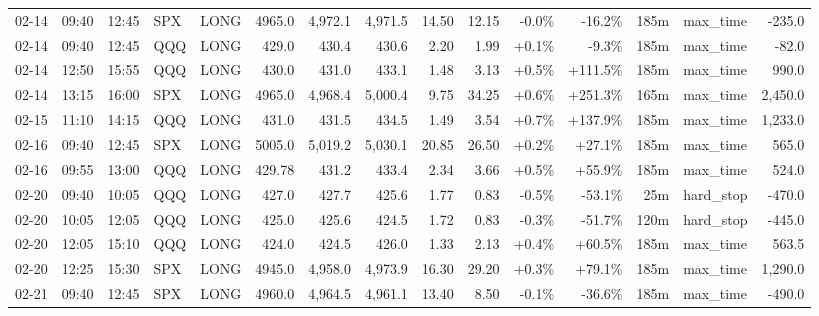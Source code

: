 \documentclass[11pt,a4paper,twoside]{article}
\begin{document}
\begin{landscape}
\begin{center}
\begin{longtable}{>{\color{txtmain}}l l l l l r r r r r r r r >{\color{txtmain}}l r}
02-14 & 09:40 & 12:45 & SPX & LONG & 4965.0 & 4,972.1 & 4,971.5 & 14.50 & 12.15 & \textcolor{lossred}{-0.0\%} & \textcolor{lossred}{-16.2\%} & 185m & max\_time & \textcolor{lossred}{-235.0} \\
02-14 & 09:40 & 12:45 & QQQ & LONG & 429.0 & 430.4 & 430.6 & 2.20 & 1.99 & \textcolor{wingreen}{+0.1\%} & \textcolor{lossred}{-9.3\%} & 185m & max\_time & \textcolor{lossred}{-82.0} \\
02-14 & 12:50 & 15:55 & QQQ & LONG & 430.0 & 431.0 & 433.1 & 1.48 & 3.13 & \textcolor{wingreen}{+0.5\%} & \textcolor{wingreen}{+111.5\%} & 185m & max\_time & \textcolor{wingreen}{990.0} \\
02-14 & 13:15 & 16:00 & SPX & LONG & 4965.0 & 4,968.4 & 5,000.4 & 9.75 & 34.25 & \textcolor{wingreen}{+0.6\%} & \textcolor{wingreen}{+251.3\%} & 165m & max\_time & \textcolor{wingreen}{2,450.0} \\
02-15 & 11:10 & 14:15 & QQQ & LONG & 431.0 & 431.5 & 434.5 & 1.49 & 3.54 & \textcolor{wingreen}{+0.7\%} & \textcolor{wingreen}{+137.9\%} & 185m & max\_time & \textcolor{wingreen}{1,233.0} \\
02-16 & 09:40 & 12:45 & SPX & LONG & 5005.0 & 5,019.2 & 5,030.1 & 20.85 & 26.50 & \textcolor{wingreen}{+0.2\%} & \textcolor{wingreen}{+27.1\%} & 185m & max\_time & \textcolor{wingreen}{565.0} \\
02-16 & 09:55 & 13:00 & QQQ & LONG & 429.78 & 431.2 & 433.4 & 2.34 & 3.66 & \textcolor{wingreen}{+0.5\%} & \textcolor{wingreen}{+55.9\%} & 185m & max\_time & \textcolor{wingreen}{524.0} \\
02-20 & 09:40 & 10:05 & QQQ & LONG & 427.0 & 427.7 & 425.6 & 1.77 & 0.83 & \textcolor{lossred}{-0.5\%} & \textcolor{lossred}{-53.1\%} & 25m & hard\_stop & \textcolor{lossred}{-470.0} \\
02-20 & 10:05 & 12:05 & QQQ & LONG & 425.0 & 425.6 & 424.5 & 1.72 & 0.83 & \textcolor{lossred}{-0.3\%} & \textcolor{lossred}{-51.7\%} & 120m & hard\_stop & \textcolor{lossred}{-445.0} \\
02-20 & 12:05 & 15:10 & QQQ & LONG & 424.0 & 424.5 & 426.0 & 1.33 & 2.13 & \textcolor{wingreen}{+0.4\%} & \textcolor{wingreen}{+60.5\%} & 185m & max\_time & \textcolor{wingreen}{563.5} \\
02-20 & 12:25 & 15:30 & SPX & LONG & 4945.0 & 4,958.0 & 4,973.9 & 16.30 & 29.20 & \textcolor{wingreen}{+0.3\%} & \textcolor{wingreen}{+79.1\%} & 185m & max\_time & \textcolor{wingreen}{1,290.0} \\
02-21 & 09:40 & 12:45 & SPX & LONG & 4960.0 & 4,964.5 & 4,961.1 & 13.40 & 8.50 & \textcolor{lossred}{-0.1\%} & \textcolor{lossred}{-36.6\%} & 185m & max\_time & \textcolor{lossred}{-490.0} \\

\end{longtable}
\end{center}
\end{landscape}
\end{document}
